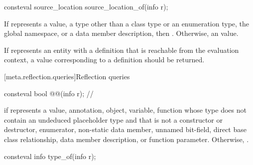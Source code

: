 %
\begin{itemdecl}
consteval source_location source_location_of(info r);
\end{itemdecl}

\begin{itemdescr}
\pnum
\returns
If  represents
a value,
a type other than a class type or an enumeration type,
the global namespace, or
a data member description,
then .
Otherwise, an
 value.

\pnum
\recommended
If  represents an entity with a definition
that is reachable from the evaluation context,
a value corresponding to a definition should be returned.
\end{itemdescr}

[meta.reflection.queries]{Reflection queries}

\begin{itemdecl}
consteval bool @@(info r);  // \expos
\end{itemdecl}

\begin{itemdescr}
\pnum
\returns
{} if  represents a
value,
annotation,
object,
variable,
function whose type does not contain an undeduced placeholder type
and that is not a constructor or destructor,
enumerator,
non-static data member,
unnamed bit-field,
direct base class relationship,
data member description, or
function parameter.
Otherwise, .
\end{itemdescr}

%
\begin{itemdecl}
consteval info type_of(info r);
\end{itemdecl}

